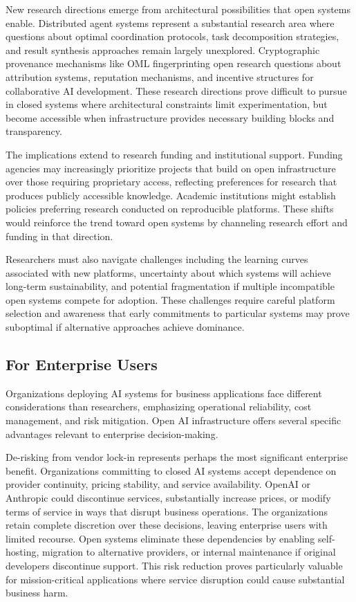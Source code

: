 New research directions emerge from architectural possibilities that open systems enable. Distributed agent systems represent a substantial research area where questions about optimal coordination protocols, task decomposition strategies, and result synthesis approaches remain largely unexplored. Cryptographic provenance mechanisms like OML fingerprinting open research questions about attribution systems, reputation mechanisms, and incentive structures for collaborative AI development. These research directions prove difficult to pursue in closed systems where architectural constraints limit experimentation, but become accessible when infrastructure provides necessary building blocks and transparency.

The implications extend to research funding and institutional support. Funding agencies may increasingly prioritize projects that build on open infrastructure over those requiring proprietary access, reflecting preferences for research that produces publicly accessible knowledge. Academic institutions might establish policies preferring research conducted on reproducible platforms. These shifts would reinforce the trend toward open systems by channeling research effort and funding in that direction.

Researchers must also navigate challenges including the learning curves associated with new platforms, uncertainty about which systems will achieve long-term sustainability, and potential fragmentation if multiple incompatible open systems compete for adoption. These challenges require careful platform selection and awareness that early commitments to particular systems may prove suboptimal if alternative approaches achieve dominance.

\subsection{For Enterprise Users}

Organizations deploying AI systems for business applications face different considerations than researchers, emphasizing operational reliability, cost management, and risk mitigation. Open AI infrastructure offers several specific advantages relevant to enterprise decision-making.

De-risking from vendor lock-in represents perhaps the most significant enterprise benefit. Organizations committing to closed AI systems accept dependence on provider continuity, pricing stability, and service availability. OpenAI or Anthropic could discontinue services, substantially increase prices, or modify terms of service in ways that disrupt business operations. The organizations retain complete discretion over these decisions, leaving enterprise users with limited recourse. Open systems eliminate these dependencies by enabling self-hosting, migration to alternative providers, or internal maintenance if original developers discontinue support. This risk reduction proves particularly valuable for mission-critical applications where service disruption could cause substantial business harm.

